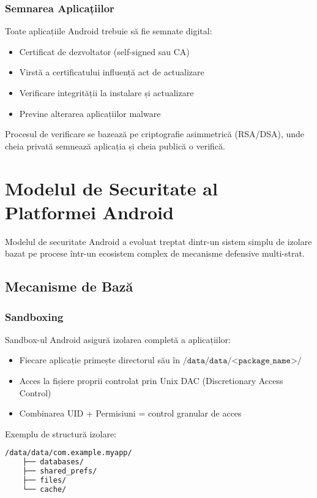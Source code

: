 \documentclass[11pt,a4paper,twocolumn]{article}
\theoremstyle{definition}
\theoremstyle{plain}
\theoremstyle{remark}
\begin{document}
\subsubsection{Semnarea Aplicațiilor}
Toate aplicațiile Android trebuie să fie semnate digital:
\begin{itemize}
    \item Certificat de dezvoltator (self-signed sau CA)
    \item Virstă a certificatului influență act de actualizare
    \item Verificare integrității la instalare și actualizare
    \item Previne alterarea aplicațiilor malware
\end{itemize}

Procesul de verificare se bazează pe criptografie asimmetrică (RSA/DSA), unde 
cheia privată semnează aplicația și cheia publică o verifică.

\section{Modelul de Securitate al Platformei Android}

Modelul de securitate Android a evoluat treptat dintr-un sistem simplu de izolare bazat pe 
procese într-un ecosistem complex de mecanisme defensive multi-strat.

\subsection{Mecanisme de Bază}

\subsubsection{Sandboxing}
Sandbox-ul Android asigură izolarea completă a aplicațiilor:
\begin{itemize}
    \item Fiecare aplicație primește directorul său în $\texttt{/data/data/<package\_name>/}$
    \item Acces la fișiere proprii controlat prin Unix DAC (Discretionary Access Control)
    \item Combinarea UID + Permisiuni = control granular de acces
\end{itemize}

Exemplu de structură izolare:
\begin{lstlisting}[language=bash, basicstyle=\ttfamily\tiny]
/data/data/com.example.myapp/
    ├── databases/
    ├── shared_prefs/
    ├── files/
    └── cache/
\end{lstlisting}
\end{document}
